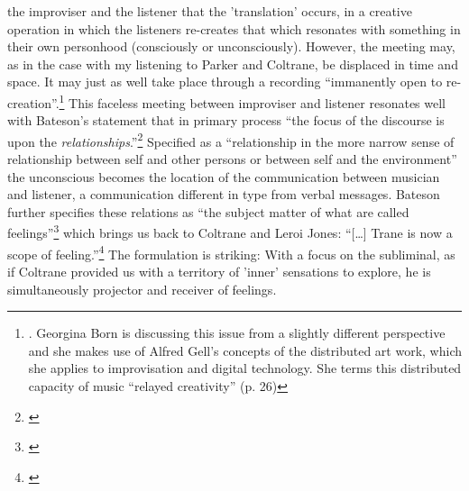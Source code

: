 the improviser and the listener that the 'translation' occurs, in a
creative operation in which the listeners re-creates that which
resonates with something in their own personhood (consciously or
unconsciously). However, the meeting may, as in the case with my
listening to Parker and Coltrane, be displaced in time and space. It
may just as well take place through a recording ``immanently open to
re-creation''.\footnote{\citet[p. 26]{Born2005}. Georgina Born is
  discussing this issue from a slightly different perspective and she
  makes use of Alfred Gell's concepts of the distributed art work,
  which she applies to improvisation and digital technology. She terms
  this distributed capacity of music ``relayed creativity'' (p. 26)}
This faceless meeting between improviser and listener resonates well
with Bateson's statement that in primary process ``the focus of the
discourse is upon the \emph{relationships}.''\footnote{\citet[p. 139]{bateson72}}
Specified as a ``relationship in the more narrow sense of relationship
between self and other persons or between self and the environment''
the unconscious becomes the location of the communication between
musician and listener, a communication different in type from verbal
messages. Bateson further specifies these relations as ``the
subject matter of what are called feelings''\footnote{\citet[p. 140]{bateson72}}
which brings us back to Coltrane and Leroi Jones: ``[\ldots] Trane is now a
scope of feeling.''\footnote{\citet{leroi65}} The formulation is striking:
With a focus on the subliminal, as if Coltrane provided us with a
territory of 'inner' sensations to explore, he is simultaneously
projector and receiver of feelings.

